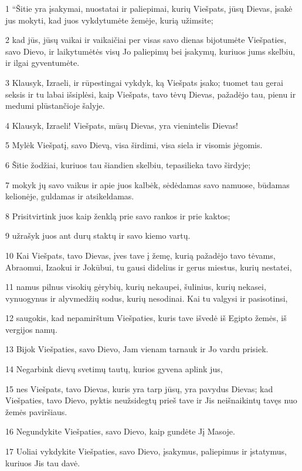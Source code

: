 \par 1 “Šitie yra įsakymai, nuostatai ir paliepimai, kurių Viešpats, jūsų Dievas, įsakė jus mokyti, kad juos vykdytumėte žemėje, kurią užimsite; 
\par 2 kad jūs, jūsų vaikai ir vaikaičiai per visas savo dienas bijotumėte Viešpaties, savo Dievo, ir laikytumėtės visų Jo paliepimų bei įsakymų, kuriuos jums skelbiu, ir ilgai gyventumėte. 
\par 3 Klausyk, Izraeli, ir rūpestingai vykdyk, ką Viešpats įsako; tuomet tau gerai seksis ir tu labai išsiplėsi, kaip Viešpats, tavo tėvų Dievas, pažadėjo tau, pienu ir medumi plūstančioje šalyje. 
\par 4 Klausyk, Izraeli! Viešpats, mūsų Dievas, yra vienintelis Dievas! 
\par 5 Mylėk Viešpatį, savo Dievą, visa širdimi, visa siela ir visomis jėgomis. 
\par 6 Šitie žodžiai, kuriuos tau šiandien skelbiu, tepasilieka tavo širdyje; 
\par 7 mokyk jų savo vaikus ir apie juos kalbėk, sėdėdamas savo namuose, būdamas kelionėje, guldamas ir atsikeldamas. 
\par 8 Prisitvirtink juos kaip ženklą prie savo rankos ir prie kaktos; 
\par 9 užrašyk juos ant durų staktų ir savo kiemo vartų. 
\par 10 Kai Viešpats, tavo Dievas, įves tave į žemę, kurią pažadėjo tavo tėvams, Abraomui, Izaokui ir Jokūbui, tu gausi didelius ir gerus miestus, kurių nestatei, 
\par 11 namus pilnus visokių gėrybių, kurių nekaupei, šulinius, kurių nekasei, vynuogynus ir alyvmedžių sodus, kurių nesodinai. Kai tu valgysi ir pasisotinsi, 
\par 12 saugokis, kad nepamirštum Viešpaties, kuris tave išvedė iš Egipto žemės, iš vergijos namų. 
\par 13 Bijok Viešpaties, savo Dievo, Jam vienam tarnauk ir Jo vardu prisiek. 
\par 14 Negarbink dievų svetimų tautų, kurios gyvena aplink jus, 
\par 15 nes Viešpats, tavo Dievas, kuris yra tarp jūsų, yra pavydus Dievas; kad Viešpaties, tavo Dievo, pyktis neužsidegtų prieš tave ir Jis neišnaikintų tavęs nuo žemės paviršiaus. 
\par 16 Negundykite Viešpaties, savo Dievo, kaip gundėte Jį Masoje. 
\par 17 Uoliai vykdykite Viešpaties, savo Dievo, įsakymus, paliepimus ir įstatymus, kuriuos Jis tau davė. 
